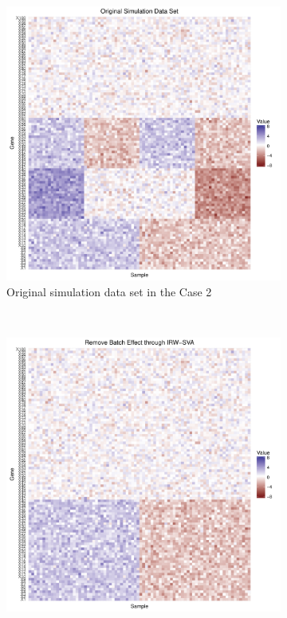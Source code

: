 \documentclass[11pt]{article}
\begin{document}
\begin{figure}[h!]
    \centering
    \begin{subfigure}[b]{0.3\textwidth}
        \centering
        \includegraphics[width = \textwidth]{figures/simulate0.pdf}
        \caption{Original simulation data set in the Case 2}
    \end{subfigure}%
~
    \begin{subfigure}[b]{0.3\textwidth}
        \centering
        \includegraphics[width = \textwidth]{figures/sva0.pdf}

\end{subfigure}
\end{figure}
\end{document}

